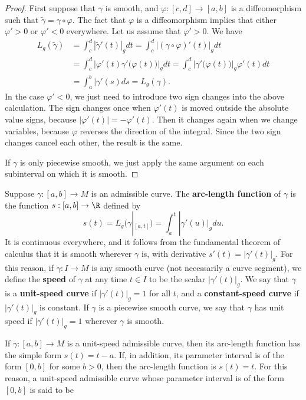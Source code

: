 \begin{proof}
First suppose that $\gamma$ is smooth, and $\varphi:[c,d]\to[a,b]$ is a diffeomorphism
such that $\widetilde{\gamma}=\gamma\circ\varphi$. The fact that $\varphi$ is a diffeomorphism implies that either $\varphi'>0$ or $\varphi'<0$ everywhere. Let us assume that $\varphi'>0$. We have
\begin{align*}
L_g(\widetilde{\gamma})&=\int_{c}^{d}|\widetilde{\gamma}'(t)|_gdt=\int_{c}^{d}|(\gamma\circ\varphi)'(t)|_gdt\\
&=\int_{c}^{d}|\varphi'(t)\gamma'\big(\varphi(t)\big)|_gdt=\int_{c}^{d}|\gamma'\big(\varphi(t)\big)|_g\varphi'(t)dt\\
&=\int_{a}^{b}|\gamma'(s)ds=L_g(\gamma).
\end{align*}
In the case $\varphi'<0$, we just need to introduce two sign changes into the above calculation. The sign changes once when $\varphi'(t)$ is moved outside the absolute value signs, because $|\varphi'(t)|=-\varphi'(t)$. Then it changes again when we change variables, because $\varphi$ reverses the direction of the integral. Since the two sign changes cancel each other, the result is the same.\par
If $\gamma$ is only piecewise smooth, we just apply the same argument on each subinterval on which it is smooth.
\end{proof}
Suppose $\gamma:[a,b]\to M$ is an admissible curve. The \textbf{arc-length function} 
of $\gamma$ is the function $s:[a,b]\to\R$ defined by
\[s(t)=L_g(\gamma|_{[a,t]})=\int_{a}^{t}|\gamma'(u)|_gdu.\]
It is continuous everywhere, and it follows from the fundamental theorem of 
calculus that it is smooth wherever $\gamma$ is, with derivative $s'(t)=|\gamma'(t)|_g$. 
For this reason, if $\gamma:I\to M$ is any smooth curve (not necessarily a 
curve segment), we define the \textbf{speed} of $\gamma$ at any time 
$t\in I$ to be the scalar $|\gamma'(t)|_g$. We say that $\gamma$ is a 
\textbf{unit-speed curve} if $|\gamma'(t)|_g=1$ for all $t$, and a 
\textbf{constant-speed curve} if $|\gamma'(t)|_g$ is constant. 
If $\gamma$ is a piecewise smooth curve, we say that $\gamma$ has unit 
speed if $|\gamma'(t)|_g=1$ wherever $\gamma$ is smooth.\par
If $\gamma:[a,b]\to M$ is a unit-speed admissible curve, then its 
arc-length function has the simple form $s(t)=t-a$. If, in addition, 
its parameter interval is of the form $[0,b]$ for some $b>0$, then the 
arc-length function is $s(t)=t$. For this reason, a unit-speed admissible 
curve whose parameter interval is of the form $[0,b]$ is said to be 
